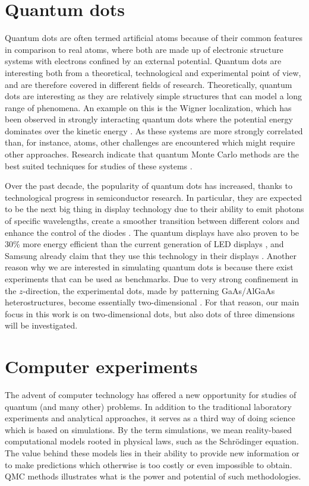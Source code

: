 \section{Quantum dots}
Quantum dots are often termed artificial atoms because of their common features in comparison to real atoms, where both are made up of electronic structure systems with electrons confined by an external potential. Quantum dots are interesting both from a theoretical, technological and experimental point of view, and are therefore covered in different fields of research. Theoretically, quantum dots are interesting as they are relatively simple structures that can model a long range of phenomena. An example on this is the Wigner localization, which has been observed in strongly interacting quantum dots where the potential energy dominates over the kinetic energy \supercite{ghosal_incipient_2007, hogberget_quantum_2013}. As these systems are more strongly correlated than, for instance, atoms, other challenges are encountered which might require other approaches. Research indicate that quantum Monte Carlo methods are the best suited techniques for studies of these systems \supercite{ghosal_incipient_2007}.

Over the past decade, the popularity of quantum dots has increased, thanks to technological progress in semiconductor research. In particular, they are expected to be the next big thing in display technology due to their ability to emit photons of specific wavelengths, create a smoother transition between different colors and enhance the control of the diodes \supercite{noauthor_samsung_nodate}. The quantum displays have also proven to be 30\% more energy efficient than the current generation of LED displays \supercite{manders_8.3:_2015}, and Samsung already claim that they use this technology in their displays \supercite{noauthor_samsung_nodate}. Another reason why we are interested in simulating quantum dots is because there exist experiments that can be used as benchmarks. Due to very strong confinement in the $z$-direction, the experimental dots, made by patterning GaAs/AlGaAs heterostructures, become essentially two-dimensional \supercite{marzin_photoluminescence_1994,brunner_sharp-line_1994}. For that reason, our main focus in this work is on two-dimensional dots, but also dots of three dimensions will be investigated.

\section{Computer experiments}
The advent of computer technology has offered a new opportunity for studies of quantum (and many other) problems. In addition to the traditional laboratory experiments and analytical approaches, it serves as a third way of doing science which is based on simulations. By the term simulations, we mean reality-based computational models rooted in physical laws, such as the Schrödinger equation. The value behind these models lies in their ability to provide new information or to make predictions which otherwise is too costly or even impossible to obtain. QMC methods illustrates what is the power and potential of such methodologies.

